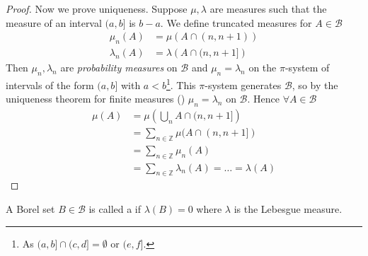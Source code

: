 \begin{proof}
	Now we prove uniqueness.
	Suppose $\mu, \lambda$ are measures such that the measure of an interval $(a,b]$ is $b - a$.
	We define truncated measures for $A \in \mathcal{B}$
	\begin{align*}
		\mu_n(A) &= \mu \left( A \cap (n,n+1) \right) \\
		\lambda_n(A) &= \lambda \left( A \cap (n,n+1] \right)
	\end{align*}
	Then $\mu_n, \lambda_n$ are \emph{probability measures} on $\mathcal{B}$ and $\mu_n = \lambda_n$ on the $\pi$-system of intervals of the form $(a, b]$ with $a < b$\footnote{As $(a, b] \cap (c, d] = \emptyset$ or $(e, f]$.}.
	This $\pi$-system generates $\mathcal{B}$, so by the uniqueness theorem for finite measures () $\mu_n = \lambda_n$ on $\mathcal B$.
	Hence $\forall A \in \mathcal{B}$
	\begin{align*}
		\mu(A) &= \mu\left(\bigcup_n A \cap (n,n+1]\right) \\
		&= \sum_{n \in \mathbb Z} \mu(A \cap (n,n+1]) \\
		&= \sum_{n \in \mathbb Z} \mu_n(A) \\
		&= \sum_{n \in \mathbb Z} \lambda_n(A) = \dots = \lambda(A)
	\end{align*}
\end{proof}

\begin{definition}
	A Borel set $B \in \mathcal B$ is called a  if $\lambda(B) = 0$ where $\lambda$ is the Lebesgue measure.
\end{definition}

